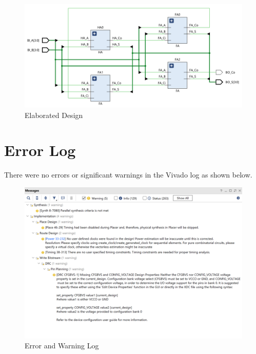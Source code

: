 \documentclass[12pt]{article}
\begin{document}
\begin{figure}[h]
    \centering
    \includegraphics[width=.8\textwidth]{Figures/CPE 133 Lab 2 Elaboragted Design.png}
    \caption{Elaborated Design}
    \label{fig:elaborateddesign}
\end{figure}

\newpage

\section{Error Log}

There were no errors or significant warnings in the Vivado log as shown below.

\begin{figure}[h]
    \centering
    \includegraphics[width=.8\textwidth]{Figures/CPE 133 Lab 2 Error Log.png}
    \caption{Error and Warning Log}
    \label{fig:warninglog}
\end{figure}
\end{document}
